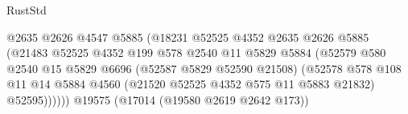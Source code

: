 \begin{lexlean}{RustStd}
\begin{coremodule}
                                                  @2635
                                                  @2626
                                                  @4547
                                                  @5885
                                                  (@18231
                                                    @52525
                                                    @4352
                                                    @2635
                                                    @2626
                                                    @5885
                                                    (@21483
                                                      @52525
                                                      @4352
                                                      @199
                                                      @578
                                                      @2540
                                                      @11
                                                      @5829
                                                      @5884
                                                      (@52579
                                                        @580
                                                        @2540
                                                        @15
                                                        @5829
                                                        @6696
                                                        (@52587 @5829 @52590 @21508)
                                                        (@52578
                                                          @578
                                                          @108
                                                          @11
                                                          @14
                                                          @5884
                                                          @4560
                                                          (@21520
                                                            @52525
                                                            @4352
                                                            @575
                                                            @11
                                                            @5883
                                                            @21832)
                                                          @52595))))))
                                              @19575
                                              (@17014 (@19580 @2619 @2642 @173))

\end{coremodule}
\end{lexlean}
